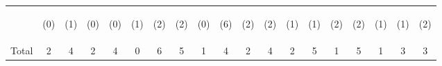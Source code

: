 \begin{tabular}{lcccccccccccccccccc}
 & \begin{footnotesize}(0)\end{footnotesize} & \begin{footnotesize}(1)\end{footnotesize} & \begin{footnotesize}(0)\end{footnotesize} & \begin{footnotesize}(0)\end{footnotesize} & \begin{footnotesize}(1)\end{footnotesize} & \begin{footnotesize}(2)\end{footnotesize} & \begin{footnotesize}(2)\end{footnotesize} & \begin{footnotesize}(0)\end{footnotesize} & \begin{footnotesize}(6)\end{footnotesize} & \begin{footnotesize}(2)\end{footnotesize} & \begin{footnotesize}(2)\end{footnotesize} & \begin{footnotesize}(1)\end{footnotesize} & \begin{footnotesize}(1)\end{footnotesize} & \begin{footnotesize}(2)\end{footnotesize} & \begin{footnotesize}(2)\end{footnotesize} & \begin{footnotesize}(1)\end{footnotesize} & \begin{footnotesize}(1)\end{footnotesize} & \begin{footnotesize}(2)\end{footnotesize}\\
\noalign{\smallskip}Total & 2 & 4 & 2 & 4 & 0 & 6 & 5 & 1 & 4 & 2 & 4 & 2 & 5 & 1 & 5 & 1 & 3 & 3\\

\end{tabular}
